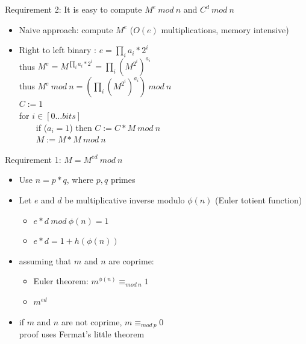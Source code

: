\documentclass{beamer}
\begin{document}
\begin{frame}[t]{Requirement 2: It is easy to compute $M^e\ mod\ n$ and $C^d\ mod\ n$}
  \begin{itemize}
  \item Naive approach: compute $M^e$ ($O(e)$ multiplications, memory intensive)
    
    \item<3-> Right to left binary : $e = \prod_i a_i*2^i$\\ 
      thus $M^e = M^{\prod_i a_i*2^i} = \prod_i (M^{2^i})^{a_i}$\\
      thus $M^e\ mod\ n = (\prod_i (M^{2^i})^{a_i})\ mod\ n$\\[20pt]
      $C:=1$\\
      for $i \in [0\dots bits]$\\
      \ \ \ \  if ($a_i=1$) then $C:= C * M\ mod\ n$\\
      \ \ \ \  $M:= M*M\ mod\ n$
  \end{itemize}
\end{frame}

\begin{frame}{Requirement 1: $M = M^{ed}\ mod\ n$}
  \begin{itemize}
    \item<2-> Use $n=p*q$, where $p,q$ primes 
    \item<3-> Let $e$ and $d$ be multiplicative inverse modulo $\phi(n)$ (Euler totient function)
      \begin{itemize}
      \item<4-> $e*d\ mod\ \phi(n) = 1$
      \item<5-> $e*d = 1 + h(\phi(n))$
      \end{itemize}
    \item<6-> assuming that $m$ and $n$ are coprime:
      \begin{itemize}
      \item<7-> Euler theorem: $m^{\phi(n)} \equiv_{mod\ n} 1$
      \item<8-> $m^{ed} $
      \end{itemize}
    \item<13> if $m$ and $n$ are not coprime, $m \equiv_{mod\ p} 0$\\
    proof uses Fermat's little theorem
  \end{itemize}
\end{frame}
\end{document}
